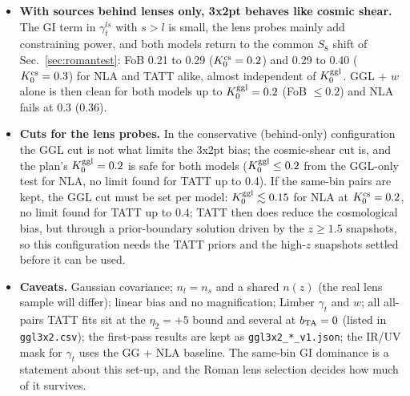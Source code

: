 \documentclass[11pt]{article}
\begin{document}
\begin{itemize}
\item \textbf{With sources behind lenses only, 3x2pt behaves like cosmic shear.} The GI term in $\gamma_t^{l s}$ with $s > l$ is small, the lens probes mainly add constraining power, and both models return to the common $S_8$ shift of Sec.~\ref{sec:romantest}: FoB 0.21 to 0.29 ($K_0^{\rm cs} = 0.2$) and 0.29 to 0.40 ($K_0^{\rm cs} = 0.3$) for NLA and TATT alike, almost independent of $K_0^{\rm ggl}$. GGL + $w$ alone is then clean for both models up to $K_0^{\rm ggl} = 0.2$ (FoB $\le 0.2$) and NLA fails at 0.3 (0.36).
\item \textbf{Cuts for the lens probes.} In the conservative (behind-only) configuration the GGL cut is not what limits the 3x2pt bias; the cosmic-shear cut is, and the plan's $K_0^{\rm ggl} = 0.2$ is safe for both models ($K_0^{\rm ggl} \le 0.2$ from the GGL-only test for NLA, no limit found for TATT up to 0.4). If the same-bin pairs are kept, the GGL cut must be set per model: $K_0^{\rm ggl} \lesssim 0.15$ for NLA at $K_0^{\rm cs} = 0.2$, no limit found for TATT up to 0.4; TATT then does reduce the cosmological bias, but through a prior-boundary solution driven by the $z \ge 1.5$ snapshots, so this configuration needs the TATT priors and the high-$z$ snapshots settled before it can be used.
\item \textbf{Caveats.} Gaussian covariance; $n_l = n_s$ and a shared $n(z)$ (the real lens sample will differ); linear bias and no magnification; Limber $\gamma_t$ and $w$; all all-pairs TATT fits sit at the $\eta_2 = +5$ bound and several at $b_{\rm TA} = 0$ (listed in \texttt{ggl3x2.csv}); the first-pass results are kept as \texttt{ggl3x2\_*\_v1.json}; the IR/UV mask for $\gamma_t$ uses the GG + NLA baseline. The same-bin GI dominance is a statement about this set-up, and the Roman lens selection decides how much of it survives.
\end{itemize}
\end{document}
